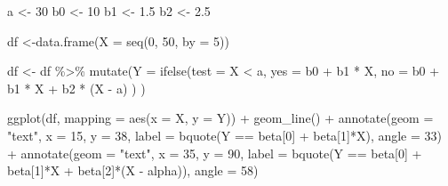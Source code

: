 \documentclass[
]{book}
\newenvironment{Shaded}{\begin{snugshade}}{\end{snugshade}}
\newcommand{\AttributeTok}[1]{\textcolor[rgb]{0.77,0.63,0.00}{#1}}
\newcommand{\DecValTok}[1]{\textcolor[rgb]{0.00,0.00,0.81}{#1}}
\newcommand{\FloatTok}[1]{\textcolor[rgb]{0.00,0.00,0.81}{#1}}
\newcommand{\FunctionTok}[1]{\textcolor[rgb]{0.00,0.00,0.00}{#1}}
\newcommand{\NormalTok}[1]{#1}
\newcommand{\OtherTok}[1]{\textcolor[rgb]{0.56,0.35,0.01}{#1}}
\newcommand{\SpecialCharTok}[1]{\textcolor[rgb]{0.00,0.00,0.00}{#1}}
\newcommand{\StringTok}[1]{\textcolor[rgb]{0.31,0.60,0.02}{#1}}
\begin{document}
\begin{Shaded}
\begin{Highlighting}[]
\NormalTok{a }\OtherTok{\textless{}{-}} \DecValTok{30}
\NormalTok{b0 }\OtherTok{\textless{}{-}} \DecValTok{10}
\NormalTok{b1 }\OtherTok{\textless{}{-}} \FloatTok{1.5}
\NormalTok{b2 }\OtherTok{\textless{}{-}} \FloatTok{2.5}

\NormalTok{df }\OtherTok{\textless{}{-}}\FunctionTok{data.frame}\NormalTok{(}\AttributeTok{X =} \FunctionTok{seq}\NormalTok{(}\DecValTok{0}\NormalTok{, }\DecValTok{50}\NormalTok{, }\AttributeTok{by =} \DecValTok{5}\NormalTok{))}

\NormalTok{df }\OtherTok{\textless{}{-}}\NormalTok{ df }\SpecialCharTok{\%\textgreater{}\%} 
  \FunctionTok{mutate}\NormalTok{(}\AttributeTok{Y =} \FunctionTok{ifelse}\NormalTok{(}\AttributeTok{test =}\NormalTok{ X }\SpecialCharTok{\textless{}}\NormalTok{ a, }
                    \AttributeTok{yes =}\NormalTok{ b0 }\SpecialCharTok{+}\NormalTok{ b1 }\SpecialCharTok{*}\NormalTok{ X,}
                    \AttributeTok{no =}\NormalTok{ b0 }\SpecialCharTok{+}\NormalTok{ b1 }\SpecialCharTok{*}\NormalTok{ X }\SpecialCharTok{+}\NormalTok{ b2 }\SpecialCharTok{*}\NormalTok{ (X }\SpecialCharTok{{-}}\NormalTok{ a)}
\NormalTok{                    )}
\NormalTok{         )}

\FunctionTok{ggplot}\NormalTok{(df, }\AttributeTok{mapping =} \FunctionTok{aes}\NormalTok{(}\AttributeTok{x =}\NormalTok{ X, }\AttributeTok{y =}\NormalTok{ Y)) }\SpecialCharTok{+}
  \FunctionTok{geom\_line}\NormalTok{() }\SpecialCharTok{+}
  \FunctionTok{annotate}\NormalTok{(}\AttributeTok{geom =} \StringTok{"text"}\NormalTok{, }\AttributeTok{x =} \DecValTok{15}\NormalTok{, }\AttributeTok{y =} \DecValTok{38}\NormalTok{, }
           \AttributeTok{label =} \FunctionTok{bquote}\NormalTok{(Y }\SpecialCharTok{==}\NormalTok{ beta[}\DecValTok{0}\NormalTok{] }\SpecialCharTok{+}\NormalTok{ beta[}\DecValTok{1}\NormalTok{]}\SpecialCharTok{*}\NormalTok{X), }\AttributeTok{angle =} \DecValTok{33}\NormalTok{) }\SpecialCharTok{+}
  \FunctionTok{annotate}\NormalTok{(}\AttributeTok{geom =} \StringTok{"text"}\NormalTok{, }\AttributeTok{x =} \DecValTok{35}\NormalTok{, }\AttributeTok{y =} \DecValTok{90}\NormalTok{, }
           \AttributeTok{label =} \FunctionTok{bquote}\NormalTok{(Y }\SpecialCharTok{==}\NormalTok{ beta[}\DecValTok{0}\NormalTok{] }\SpecialCharTok{+}\NormalTok{ beta[}\DecValTok{1}\NormalTok{]}\SpecialCharTok{*}\NormalTok{X }\SpecialCharTok{+}\NormalTok{ beta[}\DecValTok{2}\NormalTok{]}\SpecialCharTok{*}\NormalTok{(X }\SpecialCharTok{{-}}\NormalTok{ alpha)), }\AttributeTok{angle =} \DecValTok{58}\NormalTok{)}
\end{Highlighting}
\end{Shaded}
\end{document}
